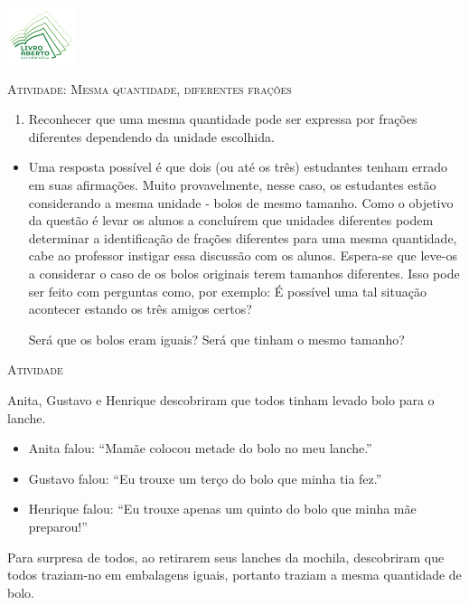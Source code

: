 \documentclass[10 pt,usenames,dvipsnames, oneside]{article}
\begin{document}
\begin{center}
  \begin{minipage}[l]{3cm}
\includegraphics[width=2cm]{../../../Figuras/logo}       
\end{minipage}\hfill
\begin{minipage}[r]{.8\textwidth}
 {\Large \scshape Atividade: Mesma quantidade, diferentes frações}  
\end{minipage}
\end{center}
\vspace{.2cm}

\ifdefined\prof
\begin{goals}
\begin{enumerate}

    \item Reconhecer que uma mesma quantidade pode ser expressa por frações diferentes dependendo da unidade escolhida.

\end{enumerate}
\tcblower

  \begin{itemize} %
  \item Uma resposta possível é que dois (ou até os três) estudantes tenham errado em suas afirmações.    Muito provavelmente, nesse caso, os estudantes estão considerando a mesma unidade - bolos de mesmo tamanho. 
Como o objetivo da questão é levar os alunos a concluírem que unidades diferentes podem determinar a identificação de frações diferentes para uma mesma quantidade, cabe ao professor instigar essa discussão com os alunos. Espera-se que leve-os a considerar o caso de os bolos originais terem tamanhos diferentes. Isso pode ser feito com perguntas como, por exemplo: É possível uma tal situação acontecer estando os três amigos certos?

Será que os bolos eram iguais? Será que tinham o mesmo tamanho? 
\end{itemize}

\end{goals}

\bigskip
\begin{center}
{\large \scshape Atividade}
\end{center}
\fi

Anita, Gustavo e Henrique descobriram que todos tinham levado bolo para o lanche.
\begin{itemize}[label=---]
\item Anita falou: ``Mamãe colocou metade do bolo no meu lanche.''
\item Gustavo falou: ``Eu trouxe um terço do bolo que minha tia fez.''
\item Henrique falou: ``Eu trouxe apenas um quinto do bolo que minha mãe preparou!''
\end{itemize}
Para surpresa de todos, ao retirarem seus lanches da mochila, descobriram que todos traziam-no em  embalagens iguais, portanto traziam a mesma quantidade de bolo.
\end{document}
